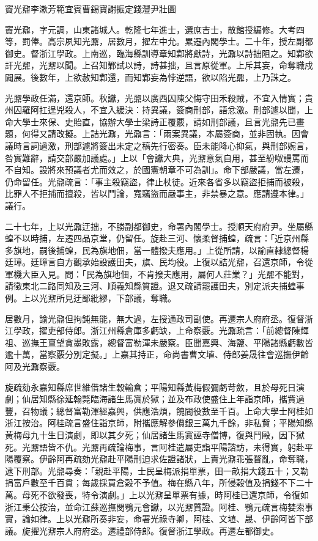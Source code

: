 
\begin{pinyinscope}
竇光鼐李漱芳範宜賓曹錫寶謝振定錢灃尹壯圖

竇光鼐，字元調，山東諸城人。乾隆七年進士，選庶吉士，散館授編修。大考四等，罰俸。高宗夙知光鼐，居數月，擢左中允。累遷內閣學士。二十年，授左副都御史。督浙江學政。上南巡，臨海縣訓導章知鄴將獻詩，光鼐以詩拙阻之。知鄴欲訐光鼐，光鼐以聞。上召知鄴試以詩，詩甚拙，且言原從軍。上斥其妄，命奪職戍闢展。後數年，上欲赦知鄴還，而知鄴妄為悖逆語，欲以陷光鼐，上乃誅之。

光鼐學政任滿，還京師。秋讞，光鼐以廣西囚陳父悔守田禾殺賊，不宜入情實；貴州囚羅阿扛逞兇殺人，不宜入緩決：持異議，簽商刑部，語忿激。刑部遽以聞，上命大學士來保、史貽直，協辦大學士梁詩正覆覈，請如刑部議，且言光鼐先已畫題，何得又請改擬。上詰光鼐，光鼐言：「兩案異議，本屬簽商，並非固執。因會議時言詞過激，刑部遽將簽出未定之稿先行密奏。臣未能降心抑氣，與刑部婉言，咎實難辭，請交部嚴加議處。」上以「會讞大典，光鼐意氣自用，甚至紛呶謾罵而不自知。設將來預議者尤而效之，於國憲朝章不可為訓」。命下部嚴議，當左遷，仍命留任。光鼐疏言：「事主殺竊盜，律止杖徒。近來各省多以竊盜拒捕而被殺，比罪人不拒捕而擅殺，皆以鬥論，寬竊盜而嚴事主，非禁暴之意。應請遵本律。」議行。

二十七年，上以光鼐迂拙，不勝副都御史，命署內閣學士。授順天府府尹。坐屬縣蝗不以時捕，左遷四品京堂，仍留任。旋赴三河、懷柔督捕蝗，疏言：「近京州縣多旗地，嗣後捕蝗，民為旗地佃，當一體撥夫應用。」上從所請，以諭直隸總督楊廷璋。廷璋言自方觀承始設護田夫，旗、民均役。上復以詰光鼐，召還京師，令從軍機大臣入見。問：「民為旗地佃，不肯撥夫應用，屬何人莊業？」光鼐不能對，請徵東北二路同知及三河、順義知縣質證。退又疏請罷護田夫，別定派夫捕蝗事例。上以光鼐所見迂鄙紕繆，下部議，奪職。

居數月，諭光鼐但拘鈍無能，無大過，左授通政司副使。再遷宗人府府丞。復督浙江學政，擢吏部侍郎。浙江州縣倉庫多虧缺，上命察覈。光鼐疏言：「前總督陳輝祖、巡撫王亶望貪墨敗露，總督富勒渾未嚴察。臣聞嘉興、海鹽、平陽諸縣虧數皆逾十萬，當察覈分別定擬。」上嘉其持正，命尚書曹文埴、侍郎姜晟往會巡撫伊齡阿及光鼐察覈。

旋疏劾永嘉知縣席世維借諸生穀輸倉；平陽知縣黃梅假彌虧苛斂，且於母死日演劇；仙居知縣徐延翰斃臨海諸生馬寘於獄；並及布政使盛住上年詣京師，攜貲過豐，召物議；總督富勒渾經嘉興，供應浩煩，餽閽役數至千百。上命大學士阿桂如浙江按治。阿桂疏言盛住詣京師，附攜應解參價銀三萬九千餘，非私貲；平陽知縣黃梅母九十生日演劇，即以其夕死；仙居諸生馬寘誣寺僧博，復與鬥毆，因下獄死。光鼐語皆不仇。光鼐再疏論梅事，言阿桂遣屬吏詣平陽諮訪，未得實，躬赴平陽覆察。伊齡阿再疏劾光鼐赴平陽刑迫求佐證諸狀，上責光鼐乖張瞀亂，命奪職，逮下刑部。光鼐尋奏：「親赴平陽，士民呈梅派捐單票，田一畝捐大錢五十；又勒捐富戶數至千百貫；每歲採買倉穀不予值。梅在縣八年，所侵穀值及捐錢不下二十萬。母死不欲發喪，特令演劇。」上以光鼐呈單票有據，時阿桂已還京師，令復如浙江秉公按治，並命江蘇巡撫閔鶚元會讞，以光鼐質證。阿桂、鶚元疏言梅婪索事實，論如律。上以光鼐所奏非妄，命署光祿寺卿，阿桂、文埴、晟、伊齡阿皆下部議。旋擢光鼐宗人府府丞。遷禮部侍郎。復督浙江學政。再遷左都御史。


\end{pinyinscope}
